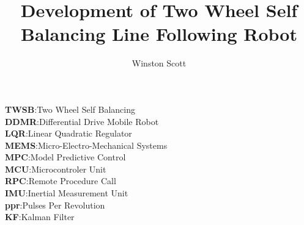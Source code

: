     
    \newcommand{\degree}{\ensuremath{^\circ}}
    \newcommand{\sus}[1]{$^{\mbox{\scriptsize #1}}$} %
    \newcommand{\sub}[1]{$_{\mbox{\scriptsize #1}}$} %
    \newcommand{\sect}[1]{Section~\ref{#1}}
    \newcommand{\fig}[1]{Fig.~\ref{#1}}
    \newcommand{\tab}[1]{Table~\ref{#1}}
    \newcommand{\equ}[1]{(\ref{#1})}
    \newcommand{\appx}[1]{Appendix~\ref{#1}}
    \usepackage[style=ieee,backend=biber,backref=true,hyperref=auto]{biblatex}
    
    

    
    \makeatletter
    \title{Development of Two Wheel Self Balancing Line Following Robot} %
    \author{Winston Scott}
    \makeatother                                               
    \maketitle

    \uomtoc
    \begin{uomterms}
        \textbf{TWSB}:Two Wheel Self Balancing \\
        \textbf{DDMR}:Differential Drive Mobile Robot \\
        \textbf{LQR}:Linear Quadratic Regulator \\
        \textbf{MEMS}:Micro-Electro-Mechanical Systems \\
        \textbf{MPC}:Model Predictive Control \\
        \textbf{MCU}:Microcontroler Unit \\
        \textbf{RPC}:Remote Procedure Call \\
        \textbf{IMU}:Inertial Measurement Unit \\
        \textbf{ppr}:Pulses Per Revolution \\
        \textbf{KF}:Kalman Filter \\
    \end{uomterms}

